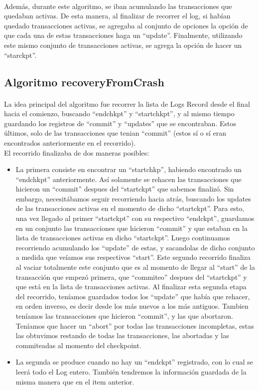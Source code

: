 \documentclass[11pt, a4paper]{article}
\begin{document}
\paragraph{}
Además, durante este algoritmo, se iban acumulando las transacciones que quedaban activas. De esta manera, al finalizar de recorrer el log, si habían quedado transacciones activas, se agregaba al conjunto de opciones la opción de que cada una de estas transacciones haga un ``update''. Finalmente, utilizando este mismo conjunto de transacciones activas, se agrega la opción de hacer un ``starckpt''.

\subsection{Algoritmo recoveryFromCrash}
\paragraph{}
La idea principal del algoritmo fue recorrer la lista de Logs Record desde el final hacia el comienzo, buscando ``endchkpt'' y ``startchkpt'', y al mismo tiempo guardando los registros de ``commit'' y ``updates'' que se encontraban. Estos últimos, solo de las transacciones que tenian ``commit'' (estos sí o sí eran encontrados anteriormente en el recorrido). \\
El recorrido finalizaba de dos maneras posibles:
\begin {itemize}
	\item  La primera consiste en encontrar un ``startchkp'', habiendo encontrado un ``endchkpt'' anteriormente. Así solamente se rehacen las transacciones que hicieron un ``commit'' despues del ``startckpt'' que sabemos finalizó. Sin embargo, necesitábamos seguir recorriendo hacia atrás, buscando los updates de las transacciones activas en el momento de dicho ``startckpt''. 
Para esto, una vez llegado al primer ``startckpt'' con su respectivo ``endckpt'', guardamos en un conjunto las transacciones que hicieron ``commit'' y que estaban en la lista de transacciones activas en dicho ``startckpt''. Luego continuamos recorriendo acumulando los ``update'' de estas, y sacandolas de dicho conjunto a medida que veíamos sus respectivos ``start''. Este segundo recorrido finaliza al vaciar totalmente este conjunto que es al momento de llegar al ``start'' de la transacción que empezó
primera, que ``commiteo'' despues del ``startckpt'' y que está en la lista de transacciones activas.
Al finalizar esta segunda etapa del recorrido, teníamos guardados todos los ``update'' que había que rehacer, en orden inverso, es decir desde los más nuevos a los más antiguos. Tambien teníamos las transacciones que hicieron ``commit'', y las que abortaron.
Teníamos que hacer un ``abort'' por todas las transacciones incompletas, estas las obtuvimos restando de todas las transacciones, las abortadas y las commiteadas al momento del checkpoint. \\
	\item La segunda se produce cuando no hay un ``endckpt'' registrado, con lo cual se leerá todo el Log entero. También tendremos la información guardada de la misma manera que en el item anterior.\\
\end{itemize}
\end{document}
